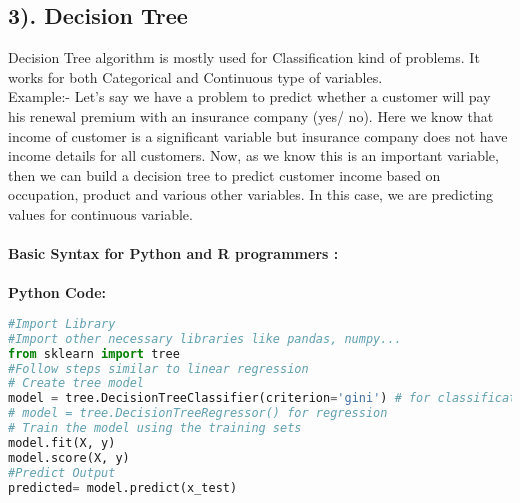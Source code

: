 \documentclass[Proceedings]{ascelike}
\begin{document}
\subsection{3). Decision Tree}
Decision Tree algorithm is mostly used for Classification kind of problems. It works for both Categorical and Continuous type of variables.\\

Example:- Let’s say we have a problem to predict whether a customer will pay his renewal premium with an insurance company (yes/ no). Here we know that income of customer is a significant variable but insurance company does not have income details for all customers. Now, as we know this is an important variable, then we can build a decision tree to predict customer income based on occupation, product and various other variables. In this case, we are predicting values for continuous variable.\\
\\\textbf{Basic Syntax for Python and R programmers :}\\
\\\textbf{Python Code:}
\begin{lstlisting}[language=Python]
#Import Library
#Import other necessary libraries like pandas, numpy...
from sklearn import tree
#Follow steps similar to linear regression
# Create tree model 
model = tree.DecisionTreeClassifier(criterion='gini') # for classification, here you can change the algorithm as gini or entropy (information gain) by default it is gini  
# model = tree.DecisionTreeRegressor() for regression
# Train the model using the training sets 
model.fit(X, y)
model.score(X, y)
#Predict Output
predicted= model.predict(x_test)
\end{lstlisting}
\end{document}
